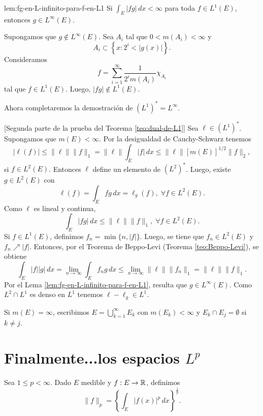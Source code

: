 \begin{lema}{lem:fg-en-L-infinito-para-f-en-L1}
Si 
$
\int_E |fg|\,dx <\infty
$
para toda $f \in L^1(E)$, entonces $g \in L^{\infty}(E)$.
\end{lema}

\begin{demo}
Supongamos que $g \notin L^{\infty}(E)$. Sea $A_i$ tal que $0<m(A_i)<\infty$ y 
\[
A_i\subset \left\{x: 2^i< |g(x)|\right\}.
\]
Consideramos  \[f = \sum\limits_{i=1}^{\infty} \frac{1}{2^im(A_i)} \chi_{A_i} \] tal que $f \in L^1(E)$. 
Luego, $|fg| \notin L^1(E)$.
\end{demo}

Ahora completaremos la demostraci\'on de
$(L^1)^*=L^{\infty}$.

\begin{demo}{}[Segunda parte de la prueba del Teorema \ref{teo:dual-de-L1}]
Sea $\ell \in (L^1)^*$. Supongamos que $m(E)<\infty$.
Por la desigualdad de Cauchy-Schwarz tenemos
\[
|\ell(f)|\leq \|\ell\|\|f\|_1=\|\ell\| \int_E |f|\,dx 
\leq \|\ell\| \left[m(E)\right]^{1/2}\|f\|_2, 
\]
si $f \in L^2(E)$.
Entonces $\ell$ define un elemento de $(L^2)^*$. Luego, existe $g \in L^2(E)$ con 
\[
\ell(f)=\int_E fg\,dx=\ell_g(f), \;\forall f \in L^2(E).
\]
Como $\ell$ es lineal y continua, 
\[
\int_E |fg|\,dx \leq \|\ell\| \|f\|_1, \;\forall f \in L^2(E).
\]
Si $f \in L^1(E)$, definimos $f_n=\min\{n, |f|\}$. Luego,  se tiene que $f_n \in L^2(E)$ y $f_n \nearrow |f|$. Entonces, por el Teorema de Beppo-Levi (Teorema \ref{teo:Beppo-Levi}), se obtiene
\[
\int_E |f| |g|\,dx =\lim\limits_{n \to \infty} \int_E f_n g\,dx 
\leq \lim\limits_{n \to \infty} \|\ell\| \|f_n\|_1
=\|\ell\| \|f\|_1.\]
Por el Lema \ref{lem:fg-en-L-infinito-para-f-en-L1}, resulta que $g \in L^{\infty}(E)$.
Como $L^2 \cap L^1$ es denso en $L^1$ tenemos $\ell-\ell_g \in L^1$.

Si $m(E)=\infty$, escribimos $E=\bigcup\limits_{k=1}^{\infty} E_k$
con $m(E_k)<\infty$ y $E_k \cap E_j=\emptyset$ si $k \neq j$.
\end{demo}





\section{Finalmente...los espacios $L^p$}

Sea $1\leq p<\infty$.  Dado $E$ medible y $f:E\to \mathbb{R}$, definimos 
\[
\|f\|_p=\left\{ \int_E |f(x)|^p\,dx \right\}^{\frac{1}{p}}.
\]

